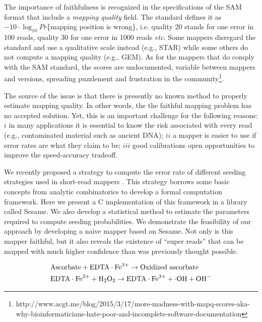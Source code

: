 \documentclass[a4,center,fleqn]{NAR}
\begin{document}
The importance of faithfulness is recognized in the specifications of the
SAM format \cite{1} that include a \emph{mapping quality} field. The
standard defines it as $-10 \cdot \log_{10}Pr$\{mapping position is
wrong\}, i.e. quality 20 stands for one error in 100 reads, quality 30 for
one error in 1000 reads \textit{etc}. Some mappers disregard the standard
and use a qualitative scale instead (e.g., STAR) while some others do not
compute a mapping quality (e.g., GEM). As for the mappers that do comply
with the SAM standard, the scores are undocumented, variable between
mappers and versions, spreading puzzlement and frustration in the
community\footnote{http://www.acgt.me/blog/2015/3/17/more-madness-with-mapq-scores-aka-why-bioinformaticians-hate-poor-and-incomplete-software-documentation}.

The source of the issue is that there is presently no known method to
properly estimate mapping quality. In other words, the the faithful
mapping problem has no accepted solution. Yet, this is an important
challenge for the following reasons:
$i$ in many applications it is essential to know the risk associated with
every read (e.g., contaminated material such as ancient DNA);
$ii$ a mapper is easier to use if error rates are what they claim to
be;
$iii$ good calibrations open opportunities to improve the speed-accuracy
tradeoff.

We recently proposed a strategy to compute the error rate of different
seeding strategies used in short-read mappers \cite{1}. This strategy
borrows some basic concepts from analytic combinatorics \cite{1} to
develop a formal computation framework. Here we present a C implementation
of this framework in a library called Sesame. We also develop a
statistical method to estimate the parameters required to compute seeding
probabilities. We demonstrate the feasibility of our approach by
developing a naive mapper based on Sesame. Not only is this mapper
faithful, but it also reveals the existence of ``super reads'' that can be
mapped with much higher confidence than was previously thought possible.

\begin{align*}
&\mathrm{Ascorbate} + \mathrm{EDTA} \cdot \mathrm{Fe}^{3+} \to
\hbox{Oxidized ascorbate}
\\
&\mathrm{EDTA} \cdot \mathrm{Fe}^{2+} + \mathrm{H}_2
\mathrm{O}_2 \to
\mathrm{EDTA} \cdot \mathrm{Fe}^{3+} + \cdot
\mathrm{OH} + \mathrm{OH}^-
\end{align*}

\enlargethispage{-65.1pt}
\end{document}

